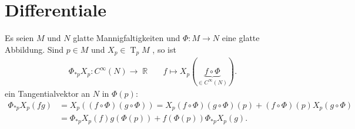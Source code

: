 \documentclass[paper=A4, twoside, chapterprefix=true, bibliography=totoc, headsepline]{scrbook}
\DeclareMathOperator{\R}{\mathbb{R}}
\DeclareMathOperator{\T}{T}         %
\theoremstyle{plain}
\theoremstyle{nonumberplain}
\theoremstyle{empty}
\theoremstyle{break}
\begin{document}



\chapter{Differentiale}
Es seien $M$ und $N$ glatte Mannigfaltigkeiten und $\Phi \colon M \to N$ eine glatte Abbildung.
Sind $p \in M$ und $X_p \in \T_pM$ , so ist 
\begin{align*}
	\Phi_{*p}X_p \colon C^{\infty}(N) \to \R && f \mapsto X_p(\underbrace{f \circ \Phi}_{\in C^{\infty}(N)}).
\end{align*}
ein Tangentialvektor an $N$ in $\Phi(p)$:
\begin{align*}
	\Phi_{*p}X_p(fg) & = X_p((f \circ \Phi)(g \circ \Phi)) = X_p(f \circ \Phi)(g \circ \Phi)(p) + (f \circ \Phi)(p)X_p(g \circ \Phi)\\
	& = \Phi_{*p}X_p(f)g(\Phi(p)) + f(\Phi(p)) \Phi_{*p}X_p(g).
\end{align*}
\end{document}
